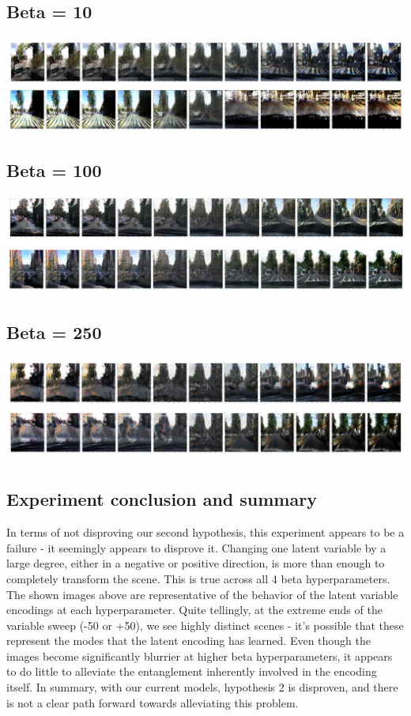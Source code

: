 \documentclass{article}
\begin{document}
\subsection{Beta = 10}
\includegraphics[scale=0.5]{resultBeta10.png} \\
\subsection{Beta = 100}
\includegraphics[scale=0.45]{resultBeta100.png} \\
\subsection{Beta = 250}
\includegraphics[scale=0.5]{resultBeta250.png} \\
\subsection{Experiment conclusion and summary}
In terms of not disproving our second hypothesis, this experiment appears to be a failure - it seemingly appears to disprove it. Changing one latent variable by a large degree, either in a negative or positive direction, is more than enough to completely transform the scene. This is true across all 4 beta hyperparameters. The shown images above are representative of the behavior of the latent variable encodings at each hyperparameter. Quite tellingly, at the extreme ends of the variable sweep (-50 or +50), we see highly distinct scenes - it's possible that these represent the modes that the latent encoding has learned. Even though the images become significantly blurrier at higher beta hyperparameters, it appears to do little to alleviate the entanglement inherently involved in the encoding itself. In summary, with our current models, hypothesis 2 is disproven, and there is not a clear path forward towards alleviating this problem. 
\end{document}
